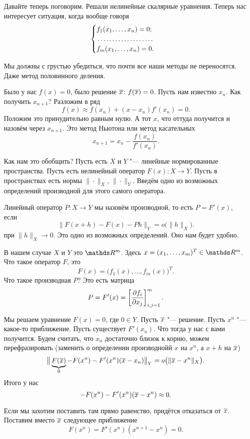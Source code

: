 
Давайте теперь поговорим. Решали нелинейные скалярные уравнения. Теперь нас интересует ситуация, когда вообще говоря
\[
  \begin{cases}
f_1(x_1,\ldots,x_n) = 0;\\
\dotfill\\
f_m(x_1,\dots,x_n)=0.
\end{cases}
\]

Мы должны с грустью убедиться, что почти все наши методы не переносятся. Даже метод половинного деления.

Было у нас $f(x)=0$, было решение $\overline{x}\colon f(\overline{x})=0$. Пусть нам известно $x_n$. Как получить $x_{n+1}$? Разложим в ряд
\[
  f(x)\approx f(x_n) + (x-x_n) f'(x_n) = 0.
\]
Положим это принудительно равным нулю. А тот $x$, что оттуда получится и назовём через $x_{n+1}$. Это метод Ньютона или метод касательных
\[
  x_{n+1} = x_n - \frac{f(x_n)}{f'(x_n)}.
\]

Как нам это обобщить? Пусть есть $X$ и $Y$ "--- линейные нормированные пространства. Пусть есть нелинейный оператор $F(x)\colon X\to Y$. Пусть в пространствах есть нормы $\|\cdot\|_X$, $\|\cdot\|_Y$. Введём одно из возможных определений производной для этого самого оператора.
\begin{Def}
Линейный оператор $P\colon X\to Y$ мы назовём производной, то есть $P = F'(x)$, если
\[
  \big\|F(x+h) - F(x) - Ph\big\|_Y = o\big(\|h\|_X\big).
\]
при $\|h\|_X\to 0$. Это одно из возможных определений. Оно нам будет удобно.

В нашем случае $X$ и $Y$ это $\R^m$. Здесь $x = (x_1,\dots,x_m)^T\in \R^m$. Что такое оператор $F$, это
\[
  F(x) = \big(f_1(x),\dots, f_m(x)\big)^T.
\]
Что такое производная $P$? Это есть матрица
\[
  P = F'(x) = \left[ \frac{\partial f_i}{\partial x_j} \right]^m_{i,j=1}.
\]
\end{Def}

Мы решаем уравнение $F(x)=0$, где $0\in Y$. Пусть $\overline{x} $ "--- решение. Пусть $x^n$ "--- какое-то приближение. Пусть существует $F'(x_n)$. Что тогда у нас с вами получится. Будем считать, что $x_n$ достаточно близок к корню, можем перефразировать (заменить о определении производнойй $x$ на $x^n$, а $x+h$ на $\overline{x}$)
\[
  \big\|\underbrace{F(\overline{x})}_0 - F(x^n) - F'(x^n)(\overline{x} - x_n)\big\|_Y = o\big(\|\overline{x} - x^n\|_X\big).
\]
Итого у нас
\[
  -F(x^n) - F'(x^n)(\overline{x}-x^n)\approx 0.
\]

Если мы захотим поставить там прямо равенство, придётся отказаться от $\overline{x}$. Поставим вместо $\overline{x}$ следующее приближение
\[
  F(x^n) = F'(x^n)(x^{n+1} - x^n) = 0.
\]

